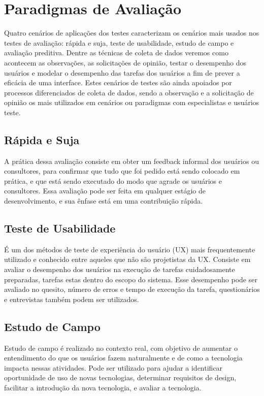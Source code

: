 \section{Paradigmas de Avaliação}

Quatro cenários de aplicações dos testes caracterizam os cenários mais usados nos testes de avaliação: rápida e suja, teste de usabilidade, estudo de campo e avaliação preditiva. Dentre as técnicas de coleta de dados veremos como acontecem as observações, as solicitações de opinião, testar o desempenho dos usuários e modelar o desempenho das tarefas dos usuários a fim de prever a eficácia de uma interface. Estes cenários de testes são ainda apoiados por processos diferenciados de coleta de dados, sendo a observação e a solicitação de opinião os mais utilizados em cenários ou paradigmas com especialistas e usuários teste.

\subsection{Rápida e Suja}

A prática dessa avaliação consiste em obter um feedback informal dos usuários ou consultores, para confirmar que tudo que foi pedido está sendo colocado em prática, e que está sendo executado do modo que agrade os usuários e consultores. Essa avaliação pode ser feita em qualquer estágio de desenvolvimento, e sua ênfase está em uma contribuição rápida.

\subsection{Teste de Usabilidade}

É um dos métodos de teste de experiência do usuário (UX) mais frequentemente utilizado e conhecido entre aqueles que não são projetistas da UX.
Consiste em avaliar o desempenho dos usuários na execução de tarefas cuidadosamente preparadas, tarefas estas dentro do escopo do sistema. Esse desempenho pode ser avaliado no quesito, número de erros e tempo de execução da tarefa, questionários e entrevistas também podem ser utilizados.


\subsection{Estudo de Campo}

Estudo de campo é realizado no contexto real, com objetivo de aumentar o entendimento do que os usuários fazem naturalmente e de como a tecnologia impacta nessas atividades. Pode ser utilizado para ajudar a identificar oportunidade de uso de novas tecnologias, determinar requisitos de design, facilitar a introdução da nova tecnologia, e avaliar a tecnologia.

